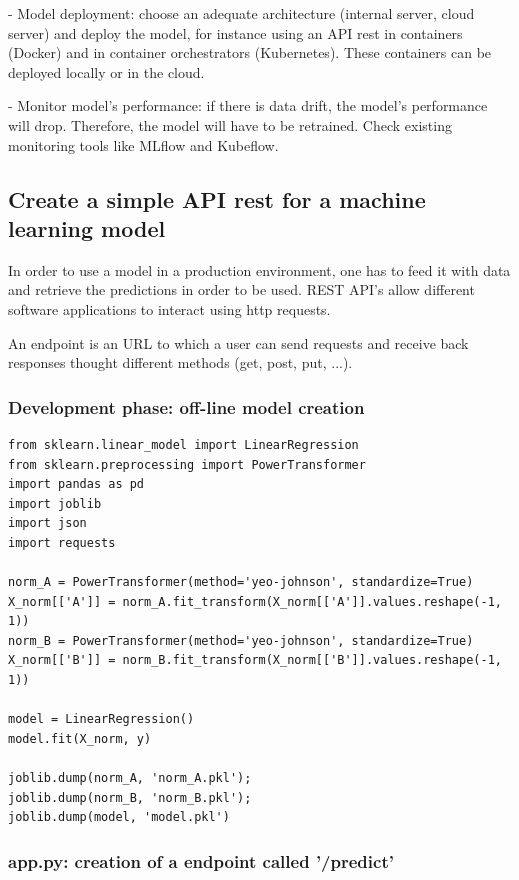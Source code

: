 \documentclass[24pt]{article}
\begin{document}
- Model deployment: choose an adequate architecture (internal server, cloud server) and deploy the model, for instance using an API rest in containers (Docker) and in container orchestrators (Kubernetes). 
These containers can be deployed locally or in the cloud.  

- Monitor model's performance: if there is data drift, the model's performance will drop. Therefore, the model will have to be retrained.  Check existing monitoring tools like MLflow and Kubeflow.

\subsection{Create a simple API rest for a machine learning model}

In order to use a model in a production environment, one has to feed it with data and retrieve the predictions in order to be used. REST API's allow different software applications to interact using http requests.

An endpoint is an URL to which a user can send requests and receive back responses thought different methods (get, post, put, ...).

\subsubsection{Development phase: off-line model creation}

\begin{lstlisting}
from sklearn.linear_model import LinearRegression
from sklearn.preprocessing import PowerTransformer
import pandas as pd
import joblib
import json
import requests

norm_A = PowerTransformer(method='yeo-johnson', standardize=True)
X_norm[['A']] = norm_A.fit_transform(X_norm[['A']].values.reshape(-1, 1))
norm_B = PowerTransformer(method='yeo-johnson', standardize=True)
X_norm[['B']] = norm_B.fit_transform(X_norm[['B']].values.reshape(-1, 1))

model = LinearRegression()
model.fit(X_norm, y)

joblib.dump(norm_A, 'norm_A.pkl');
joblib.dump(norm_B, 'norm_B.pkl');
joblib.dump(model, 'model.pkl')
\end{lstlisting}



\subsubsection{app.py: creation of a endpoint called '/predict'}
\end{document}
